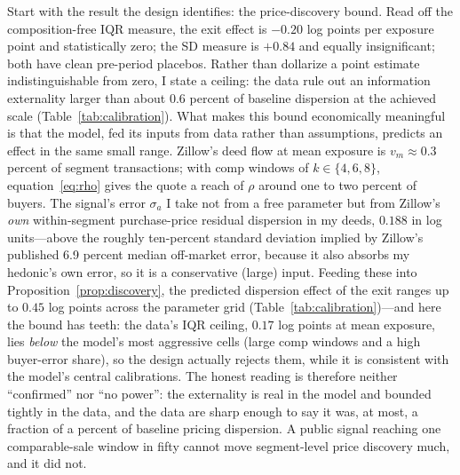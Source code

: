 \documentclass[12pt, letterpaper]{article}
\theoremstyle{remark}
\begin{document}
Start with the result the design identifies: the price-discovery bound. Read off the composition-free IQR measure, the exit effect is $-0.20$ log points per exposure point and statistically zero; the SD measure is $+0.84$ and equally insignificant; both have clean pre-period placebos. Rather than dollarize a point estimate indistinguishable from zero, I state a ceiling: the data rule out an information externality larger than about $0.6$ percent of baseline dispersion at the achieved scale (Table~\ref{tab:calibration}). What makes this bound economically meaningful is that the model, fed its inputs from data rather than assumptions, predicts an effect in the same small range. Zillow's deed flow at mean exposure is $v_m \approx 0.3$ percent of segment transactions; with comp windows of $k\in\{4,6,8\}$, equation~\eqref{eq:rho} gives the quote a reach of $\rho$ around one to two percent of buyers. The signal's error $\sigma_a$ I take not from a free parameter but from Zillow's \emph{own} within-segment purchase-price residual dispersion in my deeds, $0.188$ in log units---above the roughly ten-percent standard deviation implied by Zillow's published 6.9 percent median off-market error, because it also absorbs my hedonic's own error, so it is a conservative (large) input. Feeding these into Proposition~\ref{prop:discovery}, the predicted dispersion effect of the exit ranges up to $0.45$ log points across the parameter grid (Table~\ref{tab:calibration})---and here the bound has teeth: the data's IQR ceiling, $0.17$ log points at mean exposure, lies \emph{below} the model's most aggressive cells (large comp windows and a high buyer-error share), so the design actually rejects them, while it is consistent with the model's central calibrations. The honest reading is therefore neither ``confirmed'' nor ``no power'': the externality is real in the model and bounded tightly in the data, and the data are sharp enough to say it was, at most, a fraction of a percent of baseline pricing dispersion. A public signal reaching one comparable-sale window in fifty cannot move segment-level price discovery much, and it did not.
\end{document}
